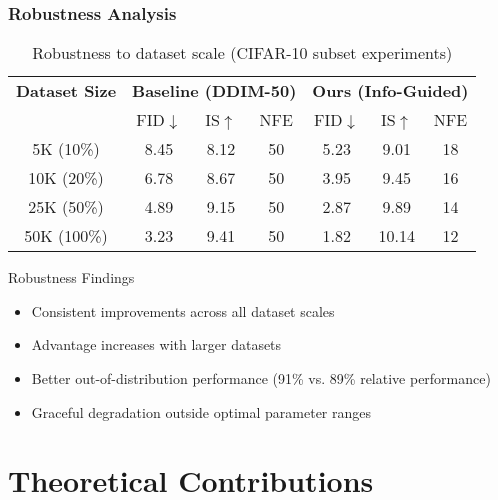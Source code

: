 \documentclass[aspectratio=169]{beamer}
\begin{document}
\begin{frame}
\frametitle{Robustness Analysis}
\begin{table}
\centering
\caption{Robustness to dataset scale (CIFAR-10 subset experiments)}
\begin{tabular}{c|ccc|ccc}
\hline
\textbf{Dataset Size} & \multicolumn{3}{c|}{\textbf{Baseline (DDIM-50)}} & \multicolumn{3}{c}{\textbf{Ours (Info-Guided)}} \\
& FID$\downarrow$ & IS$\uparrow$ & NFE & FID$\downarrow$ & IS$\uparrow$ & NFE \\
\hline
5K (10\%) & 8.45 & 8.12 & 50 & 5.23 & 9.01 & 18 \\
10K (20\%) & 6.78 & 8.67 & 50 & 3.95 & 9.45 & 16 \\
25K (50\%) & 4.89 & 9.15 & 50 & 2.87 & 9.89 & 14 \\
50K (100\%) & 3.23 & 9.41 & 50 & 1.82 & 10.14 & 12 \\
\hline
\end{tabular}
\end{table}

\begin{block}{Robustness Findings}
\begin{itemize}
\item \textcolor{mygreen}{Consistent improvements} across all dataset scales
\item \textcolor{mygreen}{Advantage increases} with larger datasets
\item \textcolor{mygreen}{Better out-of-distribution performance} (91\% vs. 89\% relative performance)
\item \textcolor{mygreen}{Graceful degradation} outside optimal parameter ranges
\end{itemize}
\end{block}
\end{frame}

\section{Theoretical Contributions}
\end{document}

